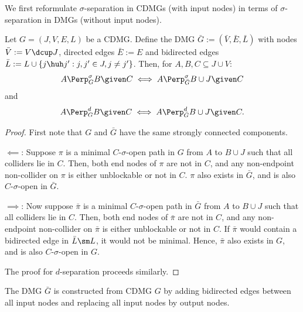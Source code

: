 We first reformulate $\sigma$-separation in CDMGs (with input nodes) in terms of $\sigma$-separation in DMGs (without input nodes).
\begin{Lem}
  Let $G=(J,V,E,L)$ be a CDMG. Define the DMG $\bar{G} := (\bar{V}, \bar{E}, \bar{L})$ with nodes $\bar{V} := V \dcup J$,
  directed edges $\bar{E} := E$ and bidirected edges $\bar{L} := L \cup \{j \huh j' : j, j' \in J, j \ne j'\}$.
  Then, for $A, B, C \subseteq J \cup V$:
  $$A \Perp_G^\sigma B \given C \iff A \Perp_{\bar{G}}^\sigma B \cup J \given C$$
  and
  $$A \Perp_G^d B \given C \iff A \Perp_{\bar{G}}^d B \cup J \given C.$$
\end{Lem}
\begin{proof}
  First note that $G$ and $\bar{G}$ have the same strongly connected components.

  $\impliedby$: Suppose $\pi$ is a minimal $C$-$\sigma$-open path in $G$ from $A$ to $B \cup J$ such that all colliders lie in $C$.
  Then, both end nodes of $\pi$ are not in $C$, and any non-endpoint non-collider on $\pi$ is either unblockable or not in $C$.
  $\pi$ also exists in $\bar{G}$, and is also $C$-$\sigma$-open in $\bar{G}$.

  $\implies$: Now suppose $\bar{\pi}$ is a minimal $C$-$\sigma$-open path in $\bar{G}$ from $A$ to $B \cup J$ such that all colliders lie in $C$.
  Then, both end nodes of $\bar{\pi}$ are not in $C$, and any non-endpoint non-collider on $\bar{\pi}$ is either unblockable or not in $C$.
  If $\bar{\pi}$ would contain a bidirected edge in $\bar{L} \sm L$, it would not be minimal.
  Hence, $\bar{\pi}$ also exists in $G$, and is also $C$-$\sigma$-open in $G$.

  The proof for $d$-separation proceeds similarly.
\end{proof}
The DMG $\bar{G}$ is constructed from CDMG $G$ by adding bidirected edges between all input nodes and replacing all input nodes by output nodes.

